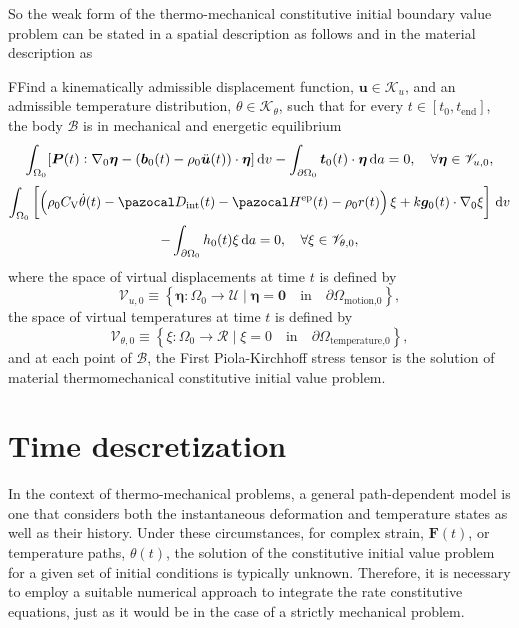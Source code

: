 So the weak form of the thermo-mechanical constitutive initial boundary value problem can be stated in a spatial description as follows
and in the material description as
\begin{problem}
    FFind a kinematically admissible displacement function, $\bm u\in \mathscr{K}_u$, and an admissible temperature distribution, \(\theta \in \mathscr K_\theta\), such that for every $t\in [t_0,t_\text{end}]$, the body $\mathscr{B}$ is in mechanical and energetic equilibrium
        \begin{equation}
        \int_{\Omega_0} [\bm{P}(t):\nabla_0 \bm \eta - (\bm b_0(t)-\rho_0\ddot{\bm u}(t))\cdot \bm \eta]\,\mathrm{d} v - \int_{\partial\Omega_0} \bm t_0(t)\cdot \bm \eta\,\mathrm{d} a = 0,\quad \forall \bm \eta \in \mathscr{V}_{u,0},
        \end{equation}
        \begin{multline}
        \int_{\Omega_0}   \left[\left(\rho_0C_\mathrm{V}\dot\theta(t) - \pazocal D_\text{int}(t) - \pazocal H^\text{ep}(t) - \rho_0 r(t)\right) \xi + k \bm g_0(t)\cdot \nabla_0 \xi\right]\ud v\\ - \int_{\partial\Omega_0} h_0(t) \xi\ud a = 0,\quad \forall \xi \in \mathscr{V}_{\theta,0},
    \end{multline}
    where the space of virtual displacements at time $t$ is defined by
    \begin{equation}
        \mathscr{V}_{u,0} \equiv \left\{\bm \eta:\Omega_0\to \mathscr{U}\;|\;\bm \eta = \bm 0\quad \text{in}\quad \partial\Omega_\text{motion,0}\right\},
    \end{equation}
    the space of virtual temperatures at time $t$ is defined by
    \begin{equation}
    \mathscr{V}_{\theta,0} \equiv \left\{\xi:\Omega_0\to \mathscr{R}\;|\; \xi =  0\quad \text{in}\quad \partial\Omega_\text{temperature,0}\right\},
    \end{equation}
    and at each point of $\mathscr{B}$, the First Piola-Kirchhoff stress tensor is the solution of material thermomechanical constitutive initial value problem.
\end{problem}

\section{Time descretization} \label{sec:time_discretization}

In the context of thermo-mechanical problems, a general path-dependent model is one that considers both the instantaneous deformation and temperature states as well as their history.
Under these circumstances, for complex strain, $\bm F(t)$, or temperature paths, $\theta(t)$, the solution of the constitutive initial value problem for a given set of initial conditions is typically unknown.
Therefore, it is necessary to employ a suitable numerical approach to integrate the rate constitutive equations, just as it would be in the case of a strictly mechanical problem.

